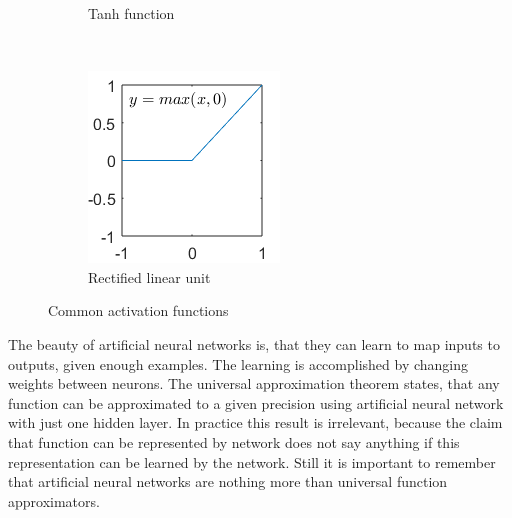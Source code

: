 \documentclass[a4paper,11pt]{article}
\begin{document}
\begin{figure}
\begin{subfigure}[b]{0.3\textwidth}
                \caption{Tanh function}
                \label{fig:tanh}
        \end{subfigure}
        ~ %
        \begin{subfigure}[b]{0.3\textwidth}
                \includegraphics[width=\textwidth]{relu.png}
                \caption{Rectified linear unit}
                \label{fig:relu}
        \end{subfigure}
        \caption{Common activation functions}\label{fig:activation_functions}
\end{figure}


\newpage

The beauty of artificial neural networks is, that they can learn to map inputs to outputs, given enough examples. The learning is accomplished by changing weights between neurons. The universal approximation theorem states, that any function can be approximated to a given precision using artificial neural network with just one hidden layer. In practice this result is irrelevant, because the claim that function can be represented by network does not say anything if this representation can be learned by the network. Still it is important to remember that artificial neural networks are nothing more than universal function approximators.
\end{document}
